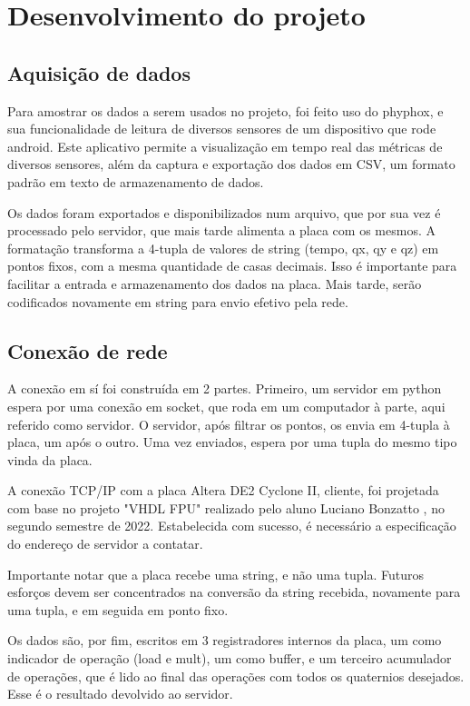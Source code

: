 \documentclass [12pt,oneside] {article}
\begin{document}
\section{Desenvolvimento do projeto}

\subsection{Aquisição de dados}

	Para amostrar os dados a serem usados no projeto, foi feito
uso do phyphox, e sua funcionalidade de leitura de diversos
sensores de um dispositivo que rode android. Este aplicativo permite a
visualização em tempo real das métricas de diversos sensores, além da
captura e exportação dos dados em CSV, um formato padrão em texto de
armazenamento de dados.

	Os dados foram exportados e disponibilizados num arquivo, que
por sua vez é processado pelo servidor, que mais tarde alimenta a
placa com os mesmos. A formatação transforma a 4-tupla de valores de
string (tempo, qx, qy e qz) em pontos fixos, com a mesma
quantidade de casas decimais. Isso é importante para facilitar a
entrada e armazenamento dos dados na placa. Mais tarde, serão
codificados novamente em string para envio efetivo pela rede.

\subsection{Conexão de rede}

	A conexão em sí foi construída em 2 partes. Primeiro, um
servidor em python espera por uma conexão em socket, que roda em um
computador à parte, aqui referido como servidor. O servidor, após filtrar
os pontos, os envia em 4-tupla à placa, um após o outro. Uma vez
enviados, espera por uma tupla do mesmo tipo vinda da placa.

	A conexão TCP/IP com a placa Altera DE2 Cyclone II, cliente,
foi projetada com base no projeto "VHDL FPU" realizado pelo aluno
Luciano Bonzatto , no segundo semestre de 2022. Estabelecida com
sucesso, é necessário a especificação do endereço de servidor a
contatar.

	Importante notar que a placa recebe uma string, e não uma
tupla. Futuros esforços devem ser concentrados na conversão da string
recebida, novamente para uma tupla, e em seguida em ponto fixo.

	Os dados são, por fim, escritos em 3 registradores internos da
placa, um como indicador de operação (load e mult), um como buffer, e
um terceiro acumulador de operações, que é lido ao final das operações
com todos os quaternios desejados. Esse é o resultado devolvido ao servidor.
\end{document}
